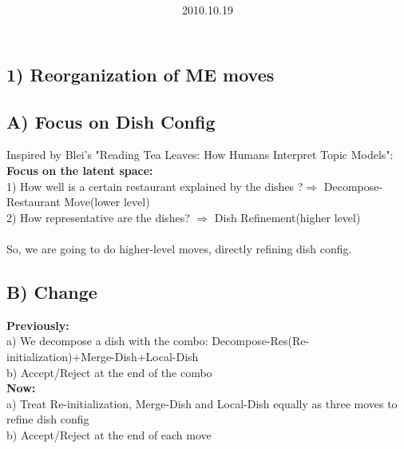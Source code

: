 \documentclass{article}
\title{\vspace{0.3in}\textmd{\textbf{\hmwkTitle}}}
\date{2010.10.19}
\author{\textbf{\hmwkAuthorName}}
\begin{document}
\begin{spacing}{1.1}
\maketitle

\section{1) Reorganization of ME moves}
\subsection{A) Focus on Dish Config}
Inspired by Blei's "Reading Tea Leaves: How Humans Interpret Topic Models":\\
{\bf Focus on the latent space:}\\
1) How well is a certain restaurant explained by the dishes ?$\Rightarrow$ Decompose-Restaurant Move(lower level)\\
2) How representative are the dishes? $\Rightarrow$ Dish Refinement(higher level)\\ \\
So, we are going to do higher-level moves, directly refining dish config.
\subsection{B) Change}
{\bf Previously:}\\
a) We decompose a dish with the combo: Decompose-Res(Re-initialization)+Merge-Dish+Local-Dish\\
b) Accept/Reject at the end of the combo\\
{\bf Now:}\\ 
a) Treat Re-initialization, Merge-Dish and Local-Dish equally as three moves to refine dish config\\
b) Accept/Reject at the end of each move\\

\end{spacing}
\end{document}
